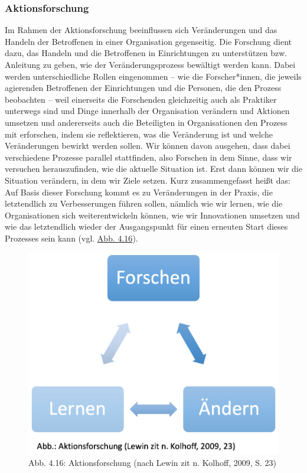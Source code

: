 \documentclass[
  letterpaper,
]{book}
\begin{document}
\subsubsection{Aktionsforschung}\label{aktionsforschung}

Im Rahmen der Aktionsforschung beeinflussen sich Veränderungen und das
Handeln der Betroffenen in einer Organisation gegenseitig. Die Forschung
dient dazu, das Handeln und die Betroffenen in Einrichtungen zu
unterstützen bzw. Anleitung zu geben, wie der Veränderungsprozess
bewältigt werden kann. Dabei werden unterschiedliche Rollen eingenommen
-- wie die Forscher*innen, die jeweils agierenden Betroffenen der
Einrichtungen und die Personen, die den Prozess beobachten -- weil
einerseits die Forschenden gleichzeitig auch als Praktiker unterwegs
sind und Dinge innerhalb der Organisation verändern und Aktionen
umsetzen und andererseits auch die Beteiligten in Organisationen den
Prozess mit erforschen, indem sie reflektieren, was die Veränderung ist
und welche Veränderungen bewirkt werden sollen. Wir können davon
ausgehen, dass dabei verschiedene Prozesse parallel stattfinden, also
Forschen in dem Sinne, dass wir versuchen herauszufinden, wie die
aktuelle Situation ist. Erst dann können wir die Situation verändern, in
dem wir Ziele setzen. Kurz zusammengefasst heißt das: Auf Basis dieser
Forschung kommt es zu Veränderungen in der Praxis, die letztendlich zu
Verbesserungen führen sollen, nämlich wie wir lernen, wie die
Organisationen sich weiterentwickeln können, wie wir Innovationen
umsetzen und wie das letztendlich wieder der Ausgangspunkt für einen
erneuten Start dieses Prozesses sein kann (vgl.
\hyperref[figure416ux5cux255D]{Abb. 4.16}).

\begin{figure}

\includegraphics[width=0.6\linewidth,height=\textheight,keepaspectratio]{images/figure416.png} \hfill{}

\caption{Abb. 4.16: Aktionsforschung (nach Lewin zit n. Kolhoff, 2009,
S. 23)}

\end{figure}%
\end{document}
